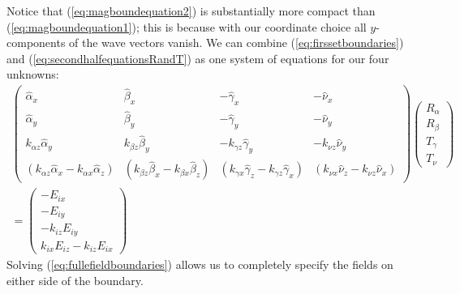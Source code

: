 \documentclass[11pt, reqno]{book}%
\newcounter{ct}
\begin{document}
\noindent Notice that (\ref{eq:magboundequation2}) is substantially more compact than (\ref{eq:magboundequation1}); this is because with our coordinate choice all $y$-components of the wave vectors vanish. We can combine (\ref{eq:firssetboundaries}) and (\ref{eq:secondhalfequationsRandT}) as one system of equations for our four unknowns:
\begin{multline}
\left( \begin{array}{cccc}
\hat{\alpha}_x & \hat{\beta}_x & - \hat{\gamma}_x  & -\hat{\nu}_x \\
\hat{\alpha}_y & \hat{\beta}_y & - \hat{\gamma}_y  & -\hat{\nu}_y \\
k_{\alpha z} \hat{\alpha}_y & k_{\beta z} \hat{\beta}_y & -k_{\gamma z} \hat{\gamma}_y &- k_{\nu z} \hat{\nu}_y \\
 \left(k_{\alpha z} \hat{\alpha}_x - k_{\alpha x}\hat{\alpha}_z \right) &  (k_{\beta z} \hat{\beta}_x - k_{\beta x}\hat{\beta}_z ) &  \left(k_{\gamma x}\hat{\gamma}_z - k_{\gamma z} \hat{\gamma}_x   \right) &  \left(k_{\nu x}\hat{\nu}_z - k_{\nu z} \hat{\nu}_x  \right)
\end{array}\right)
\left(\begin{array}{c}
R_\alpha \\
R_\beta \\
T_\gamma \\
T_\nu
\end{array}\right) \\ =
\left( \begin{array}{c}
-E_{ix} \\
-E_{iy} \\
-k_{iz} E_{iy} \\
k_{ix}E_{iz}-k_{iz}E_{ix} 
\end{array}\right)\label{eq:fullefieldboundaries}
\end{multline}
\noindent Solving (\ref{eq:fullefieldboundaries}) allows us to completely specify the fields on either side of the boundary.












\end{document}
